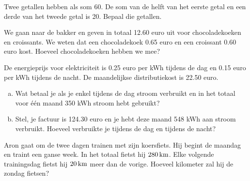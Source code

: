 \documentclass[12pt]{article}
\begin{document}
\begin{oefening}
Twee getallen hebben als som 60. De som van de helft van het eerste getal en een derde van het tweede getal is 20. Bepaal die getallen.
\end{oefening}

\begin{oefening}
We gaan naar de bakker en geven in totaal 12.60 euro uit voor chocoladekoeken en croissants. We weten dat een chocoladekoek 0.65 euro en een croissant 0.60 euro kost. Hoeveel chocoladekoeken hebben we mee?
\end{oefening}

\begin{oefening}
De energieprijs voor elektriciteit is 0.25 euro per kWh tijdens de dag en 0.15 euro per kWh tijdens de nacht. De maandelijkse distributiekost is 22.50 euro.
\begin{enumerate}[(a)]
  \item Wat betaal je als je enkel tijdens de dag stroom verbruikt en in het totaal voor één maand 350 kWh stroom hebt gebruikt?
  \item Stel, je factuur is 124.30 euro en je hebt deze maand 548 kWh aan stroom verbruikt. Hoeveel verbruikte je tijdens de dag en tijdens de nacht?
\end{enumerate}
\end{oefening}

\begin{oefening}
Aron gaat om de twee dagen trainen met zijn koersfiets. Hij begint de maandag en traint een ganse week. In het totaal fietst hij $280 \km$. Elke volgende trainingsdag fietst hij $20 \km$ meer dan de vorige. Hoeveel kilometer zal hij de zondag fietsen?
\end{oefening}

\vfill
\hfill
{}
\end{document}
